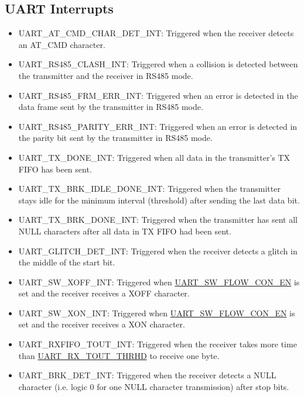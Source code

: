 \documentclass[main\_\_EN.tex]{subfiles}
\begin{document}
\subsection{UART Interrupts}
\begin{itemize}
\item \label{int:UARTATCMDCHARDETINT}UART\_AT\_CMD\_CHAR\_DET\_INT: Triggered when the receiver detects an AT\_CMD character.
\item \label{int:UARTRS485CLASHINT}UART\_RS485\_CLASH\_INT: Triggered when a collision is detected between the transmitter and the receiver in RS485 mode.
\item \label{int:UARTRS485FRMERRINT}UART\_RS485\_FRM\_ERR\_INT: Triggered when an error is detected in the data frame sent by the transmitter in RS485 mode.
\item \label{int:UARTRS485PARITYERRINT}UART\_RS485\_PARITY\_ERR\_INT: Triggered when an error is detected in the parity bit sent by the transmitter in RS485 mode.
\item \label{int:UARTTXDONEINT}UART\_TX\_DONE\_INT: Triggered when all data in the transmitter's TX FIFO has been sent.
\item \label{int:UARTTXBRKIDLEDONEINT}UART\_TX\_BRK\_IDLE\_DONE\_INT: Triggered when the transmitter stays idle for the minimum interval (threshold) after sending the last data bit.
\item \label{int:UARTTXBRKDONEINT}UART\_TX\_BRK\_DONE\_INT: Triggered when the transmitter has sent all NULL characters after all data in TX FIFO had been sent.
\item \label{int:UARTGLITCHDETINT}UART\_GLITCH\_DET\_INT: Triggered when the receiver detects a glitch in the middle of the start bit.
\item \label{int:UARTSWXOFFINT}UART\_SW\_XOFF\_INT: Triggered when \hyperref[fielddesc:UARTSWFLOWCONEN]{UART\_SW\_FLOW\_CON\_EN} is set and the receiver receives a XOFF character.
\item \label{int:UARTSWXONINT}UART\_SW\_XON\_INT: Triggered when \hyperref[fielddesc:UARTSWFLOWCONEN]{UART\_SW\_FLOW\_CON\_EN} is set and the receiver receives a XON character.
\item \label{int:UARTRXFIFOTOUTINT}UART\_RXFIFO\_TOUT\_INT: Triggered when the receiver takes more time than \hyperref[fielddesc:UARTRXTOUTTHRHD]{UART\_RX\_TOUT\_THRHD} to receive one byte.
\item \label{int:UARTBRKDETINT}UART\_BRK\_DET\_INT: Triggered when the receiver detects a NULL character (i.e. logic 0 for one NULL character transmission) after stop bits.

\end{itemize}
\end{document}
